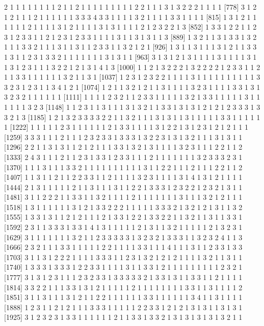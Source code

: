 \begin{Schunk}
\begin{Soutput}
 [741] 2 1 1 1 1 1 1 1 1 2 1 1 2 1 1 1 1 1 1 1 1 1 2 2 1 1 1 3 1 3 2 2 2 1 1 1 1
 [778] 3 1 2 1 2 1 1 1 2 1 1 1 1 1 1 3 3 3 4 3 3 1 1 1 1 3 2 1 1 1 1 3 3 1 1 1 1
 [815] 1 3 1 2 1 1 1 1 1 1 2 1 1 1 1 3 1 2 1 1 1 1 3 1 3 1 1 1 1 2 1 2 3 2 2 1 3
 [852] 1 3 3 1 2 2 1 1 2 3 1 2 3 3 1 1 2 1 2 3 1 2 3 3 1 1 1 1 3 1 1 3 1 3 1 1 3
 [889] 1 3 2 1 1 3 1 3 3 1 3 2 1 1 1 3 3 2 1 1 1 3 1 1 3 1 1 2 3 3 1 1 3 2 1 2 1
 [926] 1 3 1 1 3 1 1 1 3 1 2 1 1 3 3 1 3 1 1 2 3 1 3 3 2 1 1 1 1 1 1 1 3 1 3 1 1
 [963] 3 1 3 1 2 1 3 1 1 1 1 3 1 1 1 1 3 1 1 3 1 2 3 1 1 1 3 2 2 1 2 1 3 1 4 1 3
[1000] 1 1 2 1 3 2 2 2 1 3 2 2 2 2 1 2 3 3 1 1 2 1 1 3 3 1 1 1 1 1 1 3 2 1 1 3 1
[1037] 1 2 3 1 2 3 2 2 1 1 1 1 3 1 1 1 1 1 1 1 1 1 1 3 3 2 3 1 2 3 1 1 3 4 1 2 1
[1074] 1 2 1 1 3 2 1 2 1 1 3 1 1 1 1 3 2 3 1 1 1 1 3 3 1 3 1 3 2 3 2 1 1 1 1 1 1
[1111] 1 1 1 1 2 3 2 1 1 2 3 3 1 1 1 1 1 3 2 1 3 3 1 1 1 1 1 3 1 1 1 1 1 1 3 2 3
[1148] 1 1 2 3 1 1 3 1 1 1 3 1 3 2 1 1 3 3 1 3 1 3 1 2 1 2 1 2 3 3 3 1 3 3 2 1 3
[1185] 1 2 1 3 2 3 3 3 3 2 2 1 1 3 2 1 1 1 3 1 3 1 1 3 1 1 1 1 1 3 3 1 1 1 1 1 1
[1222] 1 1 1 1 1 2 3 1 1 1 1 1 1 2 1 3 3 1 1 1 1 3 1 2 2 1 3 1 2 3 1 2 1 2 1 1 1
[1259] 3 3 3 1 1 1 2 1 1 1 2 3 2 3 3 1 3 3 3 1 3 2 2 3 1 3 1 3 2 1 1 1 3 1 3 1 1
[1296] 2 2 1 1 3 1 3 1 1 2 1 2 1 1 1 3 3 1 3 2 1 3 1 1 1 1 3 2 3 1 1 1 2 2 1 1 2
[1333] 2 4 3 1 1 1 2 1 1 2 3 1 3 3 1 2 3 3 1 1 1 2 1 1 1 1 1 1 1 3 2 3 3 3 2 3 1
[1370] 1 1 1 3 1 1 1 3 3 2 1 1 1 1 1 1 1 1 1 1 3 1 1 2 2 1 1 1 2 1 1 1 2 2 1 1 2
[1407] 1 1 3 1 1 2 1 1 2 2 3 3 1 1 2 1 1 1 1 3 2 3 1 1 1 1 3 1 4 1 3 1 2 1 1 1 1
[1444] 2 1 3 1 1 1 1 1 2 1 1 3 1 1 1 3 1 1 2 2 1 3 3 3 1 2 3 2 2 1 2 3 2 1 3 1 1
[1481] 3 1 1 2 2 2 1 1 3 3 1 1 3 2 1 1 1 1 2 1 1 1 1 1 1 1 3 1 1 1 3 2 1 2 1 1 1
[1518] 1 3 1 1 1 1 1 1 3 1 2 1 3 3 2 2 2 1 1 1 1 1 3 3 3 2 1 3 2 1 2 1 3 1 1 3 2
[1555] 1 3 3 1 3 1 1 2 1 2 1 1 1 2 1 3 3 1 2 2 1 3 3 2 2 1 1 3 2 1 1 3 1 1 3 3 1
[1592] 2 3 1 1 3 3 3 1 3 3 1 4 1 3 1 1 1 1 1 2 1 3 1 1 3 2 1 1 1 1 1 2 1 3 2 3 1
[1629] 3 1 1 1 1 1 1 1 3 2 1 1 2 3 3 3 3 3 1 3 2 3 2 1 3 3 3 1 1 3 2 3 2 4 1 1 3
[1666] 2 3 2 1 1 1 3 3 1 1 1 1 1 2 2 1 1 1 1 3 3 1 1 1 4 1 1 1 3 1 1 2 3 3 1 3 3
[1703] 3 1 1 3 1 2 2 2 1 1 1 1 3 3 3 1 1 2 3 1 3 2 1 2 1 2 1 1 1 1 3 2 1 1 3 1 1
[1740] 1 3 3 3 1 3 3 3 1 2 2 3 3 1 1 1 1 3 1 1 3 3 1 2 1 1 1 1 1 1 1 1 1 2 3 2 1
[1777] 3 1 3 1 2 3 1 1 1 2 3 2 3 3 1 3 3 3 3 3 2 1 3 3 1 3 1 1 3 3 1 1 2 1 1 1 1
[1814] 3 3 2 2 1 1 1 3 3 1 3 1 2 1 1 1 1 1 2 1 1 1 1 1 1 1 1 3 3 1 1 3 1 1 1 1 2
[1851] 3 1 1 3 1 1 1 3 1 2 1 1 2 2 1 1 1 1 1 1 3 3 1 1 1 1 1 1 3 4 1 1 3 1 1 1 1
[1888] 1 2 3 1 1 2 1 2 1 1 1 3 3 3 1 1 1 1 1 2 2 3 3 1 2 1 2 1 3 1 3 1 1 3 1 3 1
[1925] 3 1 2 3 2 3 1 3 3 1 1 1 1 1 1 2 1 1 3 3 1 3 3 2 1 3 1 3 1 3 1 3 1 3 2 1 1

\end{Soutput}
\end{Schunk}
